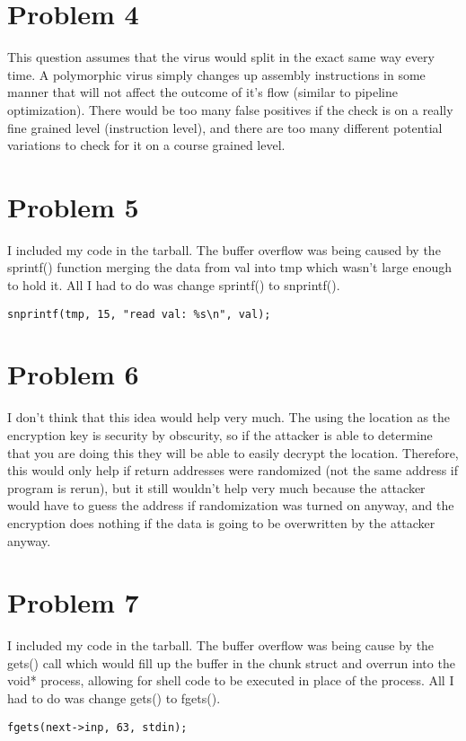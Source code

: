 \documentclass{article}
\begin{document}
\section*{Problem 4}
This question assumes that the virus would split in the exact same way every time. A polymorphic virus simply changes up assembly instructions in some manner that will not affect the outcome of it's flow (similar to pipeline optimization). There would be too many false positives if the check is on a really fine grained level (instruction level), and there are too many different potential variations to check for it on a course grained level.\\
\section*{Problem 5}
I included my code in the tarball. The buffer overflow was being caused by the sprintf() function merging the data from val into tmp which wasn't large enough to hold it. All I had to do was change sprintf() to snprintf().\\
\begin{verbatim}
snprintf(tmp, 15, "read val: %s\n", val);
\end{verbatim}
\section*{Problem 6}
I don't think that this idea would help very much. The using the location as the encryption key is security by obscurity, so if the attacker is able to determine that you are doing this they will be able to easily decrypt the location. Therefore, this would only help if return addresses were randomized (not the same address if program is rerun), but it still wouldn't help very much because the attacker would have to guess the address if randomization was turned on anyway, and the encryption does nothing if the data is going to be overwritten by the attacker anyway.\\
\section*{Problem 7}
I included my code in the tarball. The buffer overflow was being cause by the gets() call which would fill up the buffer in the chunk struct and overrun into the void* process, allowing for shell code to be executed in place of the process. All I had to do was change gets() to fgets().\\
\begin{verbatim}
fgets(next->inp, 63, stdin);
\end{verbatim}
\end{document}
